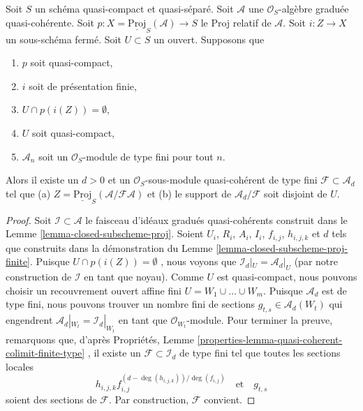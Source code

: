 \begin{lemma}
\label{lemma-closed-subscheme-proj-finite-type}
Soit  $S$  un schéma quasi-compact et quasi-séparé. Soit  $\mathcal{A}$  une
 $\mathcal{O}_S$-algèbre graduée quasi-cohérente. Soit  $p : X = \underline{\text{Proj}}_S(\mathcal{A}) \to S$  le Proj relatif de
 $\mathcal{A}$. Soit  $i : Z \to X$  un sous-schéma fermé. Soit  $U \subset S$  un ouvert.
Supposons que
\begin{enumerate}
\item $p$  soit quasi-compact,
\item $i$  soit de présentation finie,
\item $U \cap p(i(Z)) = \emptyset$,
\item $U$  soit quasi-compact,
\item $\mathcal{A}_n$  soit un  $\mathcal{O}_S$-module de type fini pour tout  $n$.
\end{enumerate}
Alors il existe un  $d > 0$  et un  $\mathcal{O}_S$-sous-module quasi-cohérent de
type fini  $\mathcal{F} \subset \mathcal{A}_d$  tel que (a)  $Z = \underline{\text{Proj}}_S(\mathcal{A}/\mathcal{F}\mathcal{A})$  et (b) le support de  $\mathcal{A}_d/\mathcal{F}$  soit
disjoint de  $U$.
\end{lemma}

\begin{proof}
Soit  $\mathcal{I} \subset \mathcal{A}$  le faisceau d'idéaux gradués quasi-cohérents construit dans le
Lemme  \ref{lemma-closed-subscheme-proj}. Soient  $U_i$,  $R_i$,  $A_i$,  $I_i$,
 $f_{i, j}$,  $h_{i, j, k}$ et  $d$  tels que construits dans la
démonstration du Lemme  \ref{lemma-closed-subscheme-proj-finite}. Puisque  $U \cap p(i(Z)) = \emptyset$ , nous voyons que
 $\mathcal{I}_d|_U = \mathcal{A}_d|_U$  (par notre construction de  $\mathcal{I}$  en tant que noyau). Comme
 $U$  est quasi-compact, nous pouvons choisir un recouvrement ouvert affine
fini  $U = W_1 \cup \ldots \cup W_m$. Puisque  $\mathcal{A}_d$  est de type fini, nous pouvons trouver un
nombre fini de sections  $g_{t, s} \in \mathcal{A}_d(W_t)$  qui engendrent  $\mathcal{A}_d|_{W_t} = \mathcal{I}_d|_{W_t}$  en tant que
 $\mathcal{O}_{W_t}$-module. Pour terminer la preuve, remarquons que, d'après Propriétés,
Lemme  \ref{properties-lemma-quasi-coherent-colimit-finite-type} , il existe un  $\mathcal{F} \subset \mathcal{I}_d$  de type fini tel que toutes les
sections locales
$$
h_{i, j, k}f_{i, j}^{(d - \deg(h_{i, j, k}))/\deg(f_{i, j})}
\quad\text{et}\quad
g_{t, s}
$$
soient des sections de  $\mathcal{F}$. Par construction,  $\mathcal{F}$  convient.
\end{proof}

